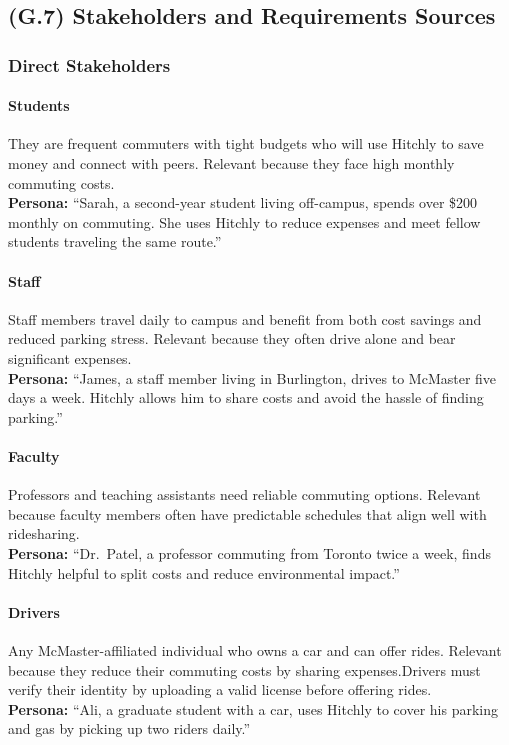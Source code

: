 \documentclass[12pt,letterpaper]{article}
\begin{document}
\subsection{(G.7) Stakeholders and Requirements Sources}
\label{sec:goals7}


\subsubsection*{Direct Stakeholders}

\paragraph{Students}
They are frequent commuters with tight budgets who will use Hitchly to save money and connect with peers. 
Relevant because they face high monthly commuting costs.\\
\textbf{Persona:} ``Sarah, a second-year student living off-campus, spends over \$200 monthly on commuting. She uses Hitchly to reduce expenses and meet fellow students traveling the same route.''

\paragraph{Staff}
Staff members travel daily to campus and benefit from both cost savings and reduced parking stress. 
Relevant because they often drive alone and bear significant expenses.\\
\textbf{Persona:} ``James, a staff member living in Burlington, drives to McMaster five days a week. Hitchly allows him to share costs and avoid the hassle of finding parking.''

\paragraph{Faculty}
Professors and teaching assistants need reliable commuting options. 
Relevant because faculty members often have predictable schedules that align well with ridesharing.\\
\textbf{Persona:} ``Dr.~Patel, a professor commuting from Toronto twice a week, finds Hitchly helpful to split costs and reduce environmental impact.''

\paragraph{Drivers}
Any McMaster-affiliated individual who owns a car and can offer rides. 
Relevant because they reduce their commuting costs by sharing expenses.Drivers must verify their identity by uploading a valid license before offering rides.\\
\textbf{Persona:} ``Ali, a graduate student with a car, uses Hitchly to cover his parking and gas by picking up two riders daily.''
\end{document}
